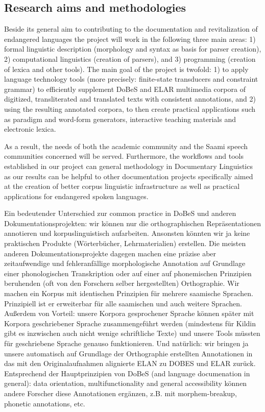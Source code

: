 \documentclass[a4paper,12pt]{article}
\begin{document}
\subsection{Research aims and methodologies}%

Beside its general aim to contributing to the documentation and revitalization of endangered languages the project will work in the following three main areas: 1) formal linguistic description (morphology and syntax as basis for parser creation), 2) computational linguistics (creation of parsers), and 3) programming (creation of lexica and other tools). The main goal of the project is twofold: 1) to apply language technology tools (more precisely: finite-state transducers and constraint grammar) to efficiently supplement DoBeS and ELAR multimedia corpora of digitized, transliterated and translated texts with consistent annotations, and 2) using the resulting annotated corpora, to then create practical applications such as paradigm and word-form generators, interactive teaching materials and electronic lexica. 

As a result, the needs of both the academic community and the Saami speech communities concerned will be served. Furthermore, the workflows and tools established in our project can %
general methodology in Documentary Linguistics as our results can be helpful to other documentation projects specifically aimed at the creation of better corpus linguistic infrastructure as well as practical applications for endangered spoken languages.

Ein bedeutender Unterschied zur common practice in DoBeS und anderen Dokumentationsprojekten: wir können nur die orthographischen Repräsentationen annotieren und korpuslinguistisch aufarbeiten. Ansonsten könnten wir ja keine praktischen Produkte (Wörterbücher, Lehrmaterialien) erstellen. Die meisten anderen Dokumentationsprojekte dagegen machen eine präzise aber zeitaufwendige und fehleranfällige morphologische Annotation auf Grundlage einer phonologischen Transkription oder auf einer auf phonemischen Prinzipien beruhenden (oft von den Forschern selber hergestellten) Orthographie. Wir machen ein Korpus mit identischen Prinzipien für mehrere saamische Sprachen. Prinzipiell ist er erweiterbar für alle saamischen und auch weitere Sprachen. Außerdem von Vorteil: unsere Korpora gesprochener Sprache können später mit Korpora geschriebener Sprache zusammengeführt werden (mindestens für Kildin gibt es inzwischen auch nicht wenige schriftliche Texte) und unsere Tools müssten für geschriebene Sprache genauso funktionieren. Und natürlich: wir bringen ja unsere automatisch auf Grundlage der Orthographie erstellten Annotationen in das mit den Originalaufnahmen alignierte ELAN zu DOBES und ELAR zurück. Entsprechend der Hauptprinzipien von DoBeS (and language documenation in general): data orientation, multifunctionality and general accessibility können andere Forscher diese Annotationen ergänzen, z.B. mit morphem-breakup, phonetic annotations, etc.%
\end{document}
